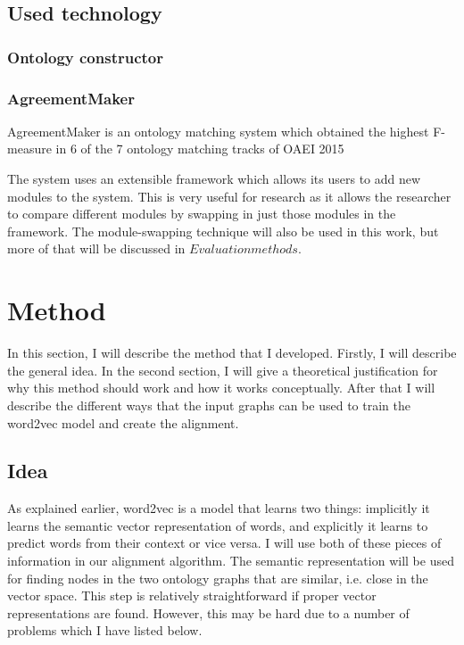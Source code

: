 \documentclass{article}
\begin{document}
 \subsection{Used technology}
 \subsubsection{Ontology constructor}
 \subsubsection{AgreementMaker}
 AgreementMaker is an ontology matching system which obtained the highest F-measure in 6 of the 7 ontology matching tracks of OAEI 2015 %
 
 The system uses an extensible framework which allows its users to add new modules to the system. This is very useful for research as it allows the researcher to compare different modules by swapping in just those modules in the framework. The module-swapping technique will also be used in this work, but more of that will be discussed in $Evaluation methods$.
 \section{Method}
 In this section, I will describe the method that I developed. Firstly, I will describe the general idea. In the second section, I will give a theoretical justification for why this method should work and how it works conceptually. After that I will describe the different ways that the input graphs can be used to train the word2vec model and create the alignment. 
 \subsection{Idea}
 As explained earlier, word2vec is a model that learns two things: implicitly it learns the semantic vector representation of words, and explicitly it learns to predict words from their context or vice versa. I will use both of these pieces of information in our alignment algorithm.
 The semantic representation will be used for finding nodes in the two ontology graphs that are similar, i.e. close in the vector space. This step is relatively straightforward if proper vector representations are found. However, this may be hard due to a number of problems which I have listed below.
\end{document}
